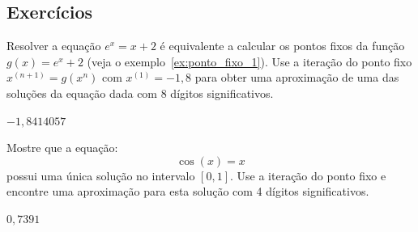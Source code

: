 \subsection*{Exercícios}

\begin{exer}
  Resolver a equação $e^x = x + 2$ é equivalente a calcular os pontos fixos da função $g(x) = e^x + 2$ (veja o exemplo~\ref{ex:ponto_fixo_1}). Use a iteração do ponto fixo $x^{(n+1)} = g(x^{n})$ com $x^{(1)} = -1,8$ para obter uma aproximação de uma das soluções da equação dada com $8$ dígitos significativos.
\end{exer}
\begin{resp}
  
    $-1,8414057$
  
\end{resp}

\begin{exer}  Mostre que a equação:
  \begin{equation*}
    \cos(x)=x  
  \end{equation*}
possui uma única solução no intervalo $[0, 1]$. Use a iteração do ponto fixo e encontre uma aproximação para esta solução com  4 dígitos significativos.
\end{exer}
\begin{resp}
  
    $0,7391$
  
\end{resp}

